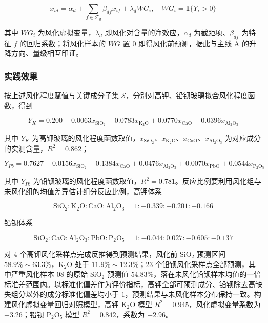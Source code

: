 \documentclass{ctexart}
\begin{document}
\begin{equation*}
x_{id}=\alpha_{d}+\sum_{f\in\mathcal{F}_d}\beta_{df}x_{if}+\lambda_{d}WG_i,\quad WG_i=\mathbf{1}\{Y_i>0\}
\end{equation*}

其中 $WG_i$ 为风化虚拟变量，$\lambda_d$ 即风化对含量的净效应，$\alpha_d$ 为截距项、$\beta_{df}$ 为特征 $f$ 的回归系数；将风化样本的 $WG$ 置 $0$ 即得风化前预测，据此与主线 A 的升降方向、量级相互印证。


\subsubsection{实践效果}

按上述风化程度赋值与关键成分子集 $\mathcal{S}$，分别对高钾、铅钡玻璃拟合风化程度函数，得到

\begin{equation*}
Y_K=0.200+0.0063x_{\mathrm{SiO_2}}-0.0783x_{\mathrm{K_2O}}+0.0770x_{\mathrm{CaO}}-0.0396x_{\mathrm{Al_2O_3}}
\end{equation*}

其中 $Y_K$ 为高钾玻璃的风化程度函数取值，$x_{\mathrm{SiO_2}}$、$x_{\mathrm{K_2O}}$、$x_{\mathrm{CaO}}$、$x_{\mathrm{Al_2O_3}}$ 为对应成分的实测含量，$R^2=0.862$；

\begin{equation*}
Y_{Pb}=0.7627-0.0156x_{\mathrm{SiO_2}}-0.1384x_{\mathrm{CaO}}+0.0476x_{\mathrm{Al_2O_3}}+0.0070x_{\mathrm{PbO}}+0.0544x_{\mathrm{P_2O_5}}
\end{equation*}

其中 $Y_{Pb}$ 为铅钡玻璃的风化程度函数取值，$R^2=0.781$。反应比例要利用风化组与未风化组的均值差异估计组分反应比例，高钾体系

\begin{equation*}
\mathrm{SiO_2}:\mathrm{K_2O}:\mathrm{\mathrm{CaO}}:\mathrm{Al_2O_3}=1:-0.339:-0.201:-0.166
\end{equation*}

铅钡体系

\begin{equation*}
\mathrm{SiO_2}:\mathrm{\mathrm{CaO}}:\mathrm{Al_2O_3}:\mathrm{\mathrm{PbO}}:\mathrm{P_2O_5}=1:-0.044:0.027:-0.605:-0.137
\end{equation*}

对 $4$ 个高钾风化采样点完成反推得到预测结果，风化前 $\mathrm{SiO_2}$ 预测区间 $58.9\%\sim63.3\%$，$\mathrm{K_2O}$ 处于 $11.9\%\sim12.3\%$；$23$ 个铅钡风化采样点全部预测，其中严重风化样本 08 的原始 $\mathrm{SiO_2}$ 预测值 $54.83\%$，落在未风化铅钡样本均值的一倍标准差范围内。以标准化偏差作为评价指标，高钾全部可预测成分、铅钡除去高缺失组分以外的成分标准化偏差均小于 $1$，预测结果与未风化样本分布保持一致。构建风化虚拟变量回归对照模型，高钾 $\mathrm{K_2O}$ 模型 $R^2=0.945$，风化虚拟变量系数为 $-3.26$；铅钡 $\mathrm{P_2O_5}$ 模型 $R^2=0.842$，系数为 $+2.96$。
\end{document}
